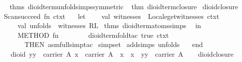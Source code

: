 \begin{isabellebody}
\endisaantiq
\ %
\isaantiq
thms\ dioid{}term{}unfold{}simps{}symmetric{}{}%
\endisaantiq
\ %
\isaantiq
thm\ dioid{}term{}closure{}%
\endisaantiq
\isanewline
\isanewline
{}\isanewline
\isanewline
{}\isamarkupfalse%
\ dioid{}closure\ {}\ {}\isanewline
Scan{}succeed\ {}fn\ ctxt\ {}{}\isanewline
\ \ let\isanewline
\ \ \ \ val\ witnesses\ {}\ Locale{}get{}witnesses\ ctxt\isanewline
\ \ \ \ val\ unfolds\ {}\ witnesses\ RL\ %
\isaantiq
thms\ dioid{}term{}atoms{}simps{}%
\endisaantiq
\isanewline
\ \ in\isanewline
\ \ \ \ METHOD\ {}fn\ {}\ {}{}\isanewline
\ \ \ \ \ \ dioid{}term{}fold{}tac\ true\ ctxt\ {}\isanewline
\ \ \ \ \ \ THEN\ asm{}full{}simp{}tac\ {}%
\isaantiq
simpset{}%
\endisaantiq
\ addsimps\ unfolds{}\ {}{}\isanewline
\ \ end{}\isanewline
{}%
\endisatagML
{\isafoldML}%
%
\isadelimML
\isanewline
%
\endisadelimML
\isanewline
{}\isamarkupfalse%
\ {}\ dioid{}\ {}{}y{}y\ {}\ carrier\ A{}\ x\ {}\ carrier\ A{}\ {}\ x\ {}\ x\ {}\ y{}y\ {}\ carrier\ A{}\isanewline
%
\isadelimproof
\ \ %
\endisadelimproof
%
\isatagproof
{}\isamarkupfalse%
\ dioid{}closure%
\endisatagproof
{\isafoldproof}%
%
\isadelimproof
\isanewline
%
\endisadelimproof
%
\isadelimtheory
\isanewline
%
\endisadelimtheory
%
\isatagtheory
{}\isamarkupfalse%
%
\endisatagtheory
{\isafoldtheory}%
%
\isadelimtheory
\isanewline
%
\endisadelimtheory
\end{isabellebody}%
